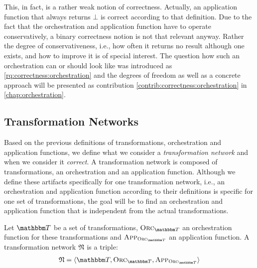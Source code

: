 This, in fact, is a rather weak notion of correctness. 
Actually, an application function that always returns $\bot$ is correct according to that definition.
Due to the fact that the orchestration and application function have to operate conservatively, a binary correctness notion is not that relevant anyway.
Rather the degree of conservativeness, i.e., how often it returns no result although one exists, and how to improve it is of special interest.
The question how such an orchestration can or should look like was introduced as \autoref{rq:correctness:orchestration} and the degrees of freedom as well as a concrete approach will be presented as contribution \autoref{contrib:correctness:orchestration} in \autoref{chap:orchestration}.


\subsection{Transformation Networks}

Based on the previous definitions of transformations, orchestration and application functions, we define what we consider a \emph{transformation network} and when we consider it \emph{correct}.
A transformation network is composed of transformations, an orchestration and an application function.
Although we define these artifacts specifically for one transformation network, i.e., an orchestration and application function according to their definitions is specific for one set of transformations, the goal will be to find an orchestration and application function that is independent from the actual transformations.

\begin{definition}
    \label{def:transformationnetwork}
    Let $\transformationset{T}$ be a set of transformations, $\orcfunction{\transformationset{T}}$ an orchestration function for these transformations and $\appfunction{\orcfunction{\transformationset{T}}}$ an application function.
    A transformation network $\mathfrak{N}$ is a triple:
    \begin{align*}
        \transformationnetwork{N} = \tupled{\transformationset{T}, \orcfunction{\transformationset{T}}, \appfunction{\orcfunction{\transformationset{T}}}}
    \end{align*}
\end{definition}

